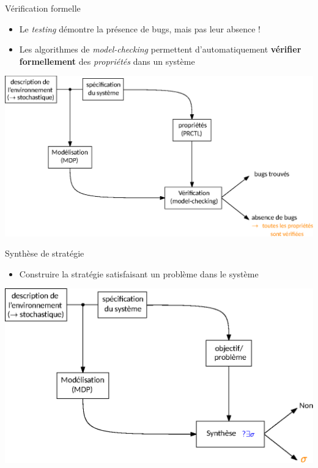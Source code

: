 \documentclass[compress]{beamer}
\theoremstyle{theorem}%
\begin{document}
\begin{frame}{Vérification formelle}\small
  \begin{itemize}
    \item Le \textit{testing} démontre la présence de bugs, mais pas leur absence !
    \item Les algorithmes de \textit{\color{orange}model-checking} permettent d'automatiquement \textbf{\color{fibeamer@orange}vérifier formellement} des \textit{\color{fibeamer@orange}propriétés} dans un système
    \end{itemize}
    \begin{center}
      \includegraphics[width=0.9\linewidth]{resources/formal-verif}
    \end{center}
\end{frame}


\begin{frame}{Synthèse de stratégie}
  \begin{itemize}
    \item Construire la stratégie satisfaisant un problème dans le système
  \end{itemize}
  \begin{center}
    \includegraphics[width=0.83\linewidth]{resources/synthese}
  \end{center}
\end{frame}
\end{document}

